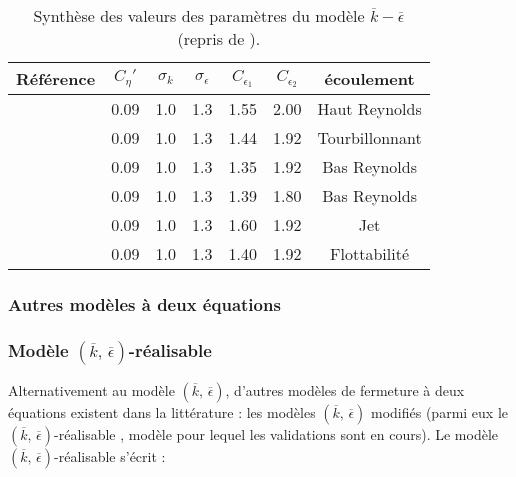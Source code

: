 \begin{table}
\begin{centering}
\begin{tabular}{ccccccc}
\hline 
R\'ef\'erence & $C_{\eta}'$ & $\sigma_{k}$ & $\sigma_{\epsilon}$ & $C_{\epsilon_{1}}$ & $C_{\epsilon_{2}}$ & \'ecoulement\tabularnewline
\hline 
\cite{Jones-Launder_IJHMT1972} & 0.09 & 1.0 & 1.3 & 1.55 & 2.00 & Haut Reynolds\tabularnewline
\cite{Launder-Sharma_LettHMT1974} & 0.09 & 1.0 & 1.3 & 1.44 & 1.92 & Tourbillonnant\tabularnewline
\cite{Chien_AIAA1982} & 0.09 & 1.0 & 1.3 & 1.35 & 1.92 & Bas Reynolds\tabularnewline
\cite{Fan_etal_AIAA1993} & 0.09 & 1.0 & 1.3 & 1.39 & 1.80 & Bas Reynolds\tabularnewline
\cite{Morgans-etal_Conf1999} & 0.09 & 1.0 & 1.3 & 1.60 & 1.92 & Jet\tabularnewline
\cite{Bahari-Hejazi_IJPMS2009} & 0.09 & 1.0 & 1.3 & 1.40 & 1.92 & Flottabilit\'e\tabularnewline
\hline 
\end{tabular}
\par\end{centering}

\protect\caption{\label{tab:Synthese-valeurs_Coeffkeps}Synth\`ese des valeurs des param\`etres
du mod\`ele $\overline{k}-\overline{\epsilon}$ (repris de \cite{Genty_RapportCEA_2019}).}
\end{table}



\subsubsection{Autres mod\`eles \`a deux \'equations}


\subsubsection*{Mod\`ele $(\overline{k},\,\overline{\epsilon})$-\og r\'ealisable \fg{}}

Alternativement au mod\`ele $(\overline{k},\,\overline{\epsilon})$,
d'autres mod\`eles de fermeture \`a deux \'equations existent dans la litt\'erature
: les mod\`eles $(\overline{k},\,\overline{\epsilon})$ modifi\'es (parmi
eux le $(\overline{k},\,\overline{\epsilon})$-\og r\'ealisable \fg{}
, mod\`ele pour lequel les validations sont en cours). Le mod\`ele $(\overline{k},\,\overline{\epsilon})$-\og r\'ealisable \fg{}
s'\'ecrit \cite[Eq. (22) et (23) p. 233]{Shi_etal_keps-realisable_CF1995}
:

